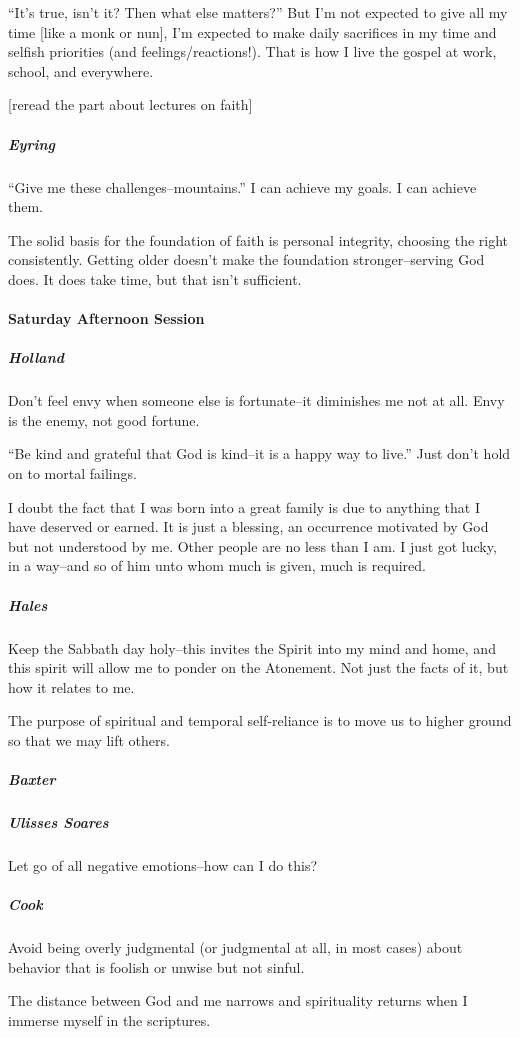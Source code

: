 ``It's true, isn't it? Then what else matters?'' But I'm not expected to give all my time [like a monk or nun], I'm expected to make daily sacrifices in my time and selfish priorities (and feelings/reactions!). That is how I live the gospel at work, school, and everywhere.

[reread the part about lectures on faith]

\subparagraph*{Eyring} ``Give me these challenges--mountains.'' I can achieve my goals. I can achieve them.

The solid basis for the foundation of faith is personal integrity, choosing the right consistently. Getting older doesn't make the foundation stronger--serving God does. It does take time, but that isn't sufficient.

\paragraph*{Saturday Afternoon Session}

\subparagraph*{Holland} Don't feel envy when someone else is fortunate--it diminishes me not at all. Envy is the enemy, not good fortune.

``Be kind and grateful that God is kind--it is a happy way to live.'' Just don't hold on to mortal failings.

I doubt the fact that I was born into a great family is due to anything that I have deserved or earned. It is just a blessing, an occurrence motivated by God but not understood by me. Other people are no less than I am. I just got lucky, in a way--and so of him unto whom much is given, much is required.

\subparagraph*{Hales} Keep the Sabbath day holy--this invites the Spirit into my mind and home, and this spirit will allow me to ponder on the Atonement. Not just the facts of it, but how it relates to me.

The purpose of spiritual and temporal self-reliance is to move us to higher ground so that we may lift others.

\subparagraph*{Baxter}

\subparagraph*{Ulisses Soares} Let go of all negative emotions--how can I do this?

\subparagraph*{Cook} Avoid being overly judgmental (or judgmental at all, in most cases) about behavior that is foolish or unwise but not sinful.

The distance between God and me narrows and spirituality returns when I immerse myself in the scriptures.

